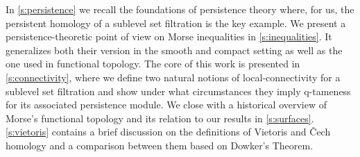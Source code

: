 In \cref{s:persistence} we recall the foundations of persistence theory where, for us, the persistent homology of a sublevel set filtration is the key example.
We present a persistence-theoretic point of view on Morse inequalities in \cref{s:inequalities}.
It generalizes both their version in the smooth and compact setting as well as the one used in functional topology.
The core of this work is presented in \cref{s:connectivity}, where we define two natural notions of local-connectivity for a sublevel set filtration and show under what circumstances they imply q-tameness for its associated persistence module.
We close with a historical overview of Morse's functional topology and its relation to our results in \cref{s:surfaces}.
\cref{s:vietoris} contains a brief discussion on the definitions of Vietoris and \v{C}ech homology and a comparison between them based on Dowker's Theorem.
